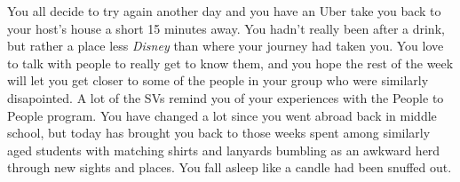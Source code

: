 \documentclass[../main.tex]{subfiles}
\begin{document}
You all decide to try again another day and you have an Uber take you back to your host's house a short 15 minutes away. You hadn't really been after a drink, but rather a place less \textit{Disney} than where your journey had taken you. You love to talk with people to really get to know them, and you hope the rest of the week will let you get closer to some of the people in your group who were similarly disapointed. A lot of the SVs remind you of your experiences with the People to People program. You have changed a lot since you went abroad back in middle school, but today has brought you back to those weeks spent among similarly aged students with matching shirts and lanyards bumbling as an awkward herd through new sights and places. You fall asleep like a candle had been snuffed out.
\end{document}
